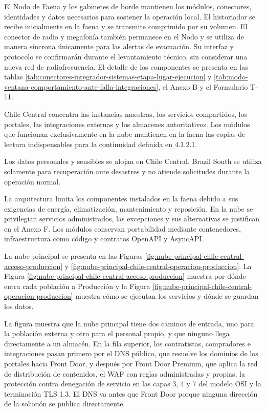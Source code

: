 \documentclass[subdoc]{../../comun/overfore}
\begin{document}
El Nodo de Faena y los gabinetes de borde mantienen los módulos, conectores, identidades y datos necesarios para sostener la operación local. El historiador se recibe inicialmente en la faena y se transmite comprimido por su volumen. El conector de radio y megafonía también permanece en el Nodo y se utiliza de manera síncrona únicamente para las alertas de evacuación. Su interfaz y protocolo se confirmarán durante el levantamiento técnico, sin considerar una nueva red de radiofrecuencia. El detalle de los componentes se presenta en las tablas \ref{tab:conectores-integrador-sistemas-etapa-lugar-ejecucion} y \ref{tab:modo-ventana-comportamiento-ante-falla-integraciones}, el Anexo B y el Formulario T-11.

Chile Central concentra las instancias maestras, los servicios compartidos, los portales, las integraciones externas y los almacenes autoritativos. Los módulos que funcionan exclusivamente en la nube mantienen en la faena las copias de lectura indispensables para la continuidad definida en 4.1.2.1.

Los datos personales y sensibles se alojan en Chile Central. Brazil South se utiliza solamente para recuperación ante desastres y no atiende solicitudes durante la operación normal.

La arquitectura limita los componentes instalados en la faena debido a sus exigencias de energía, climatización, mantenimiento y reposición. En la nube se privilegian servicios administrados, las excepciones y sus alternativas se justifican en el Anexo F. Los módulos conservan portabilidad mediante contenedores, infraestructura como código y contratos OpenAPI y AsyncAPI.

La nube principal se presenta en las Figuras \ref{fig:nube-principal-chile-central-acceso-produccion} y \ref{fig:nube-principal-chile-central-operacion-produccion}. La Figura \ref{fig:nube-principal-chile-central-acceso-produccion} muestra por dónde entra cada población a Producción y la Figura \ref{fig:nube-principal-chile-central-operacion-produccion} muestra cómo se ejecutan los servicios y dónde se guardan los datos.

\begin{horizontal}
\end{horizontal}
La figura muestra que la nube principal tiene dos caminos de entrada, uno para la población externa y otro para el personal propio, y que ninguno llega directamente a un almacén. En la fila superior, los contratistas, compradores e integraciones pasan primero por el DNS público, que resuelve los dominios de los portales hacia Front Door, y después por Front Door Premium, que aplica la red de distribución de contenidos, el WAF con reglas administradas y propias, la protección contra denegación de servicio en las capas 3, 4 y 7 del modelo OSI y la terminación TLS 1.3. El DNS va antes que Front Door porque ninguna dirección de la solución se publica directamente.
\end{document}
